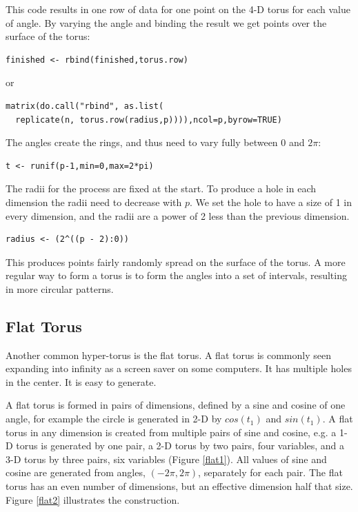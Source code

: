 \documentclass[article]{jss}
\begin{document}
This code results in one row of data for one point on the 4-D torus
for each value of angle.  By varying the angle and binding the result
we get points over the surface of the torus:

\begin{verbatim}
finished <- rbind(finished,torus.row)
\end{verbatim}

or

\begin{verbatim}
matrix(do.call("rbind", as.list(
  replicate(n, torus.row(radius,p)))),ncol=p,byrow=TRUE)
\end{verbatim}

The angles create the rings, and thus need to vary fully between 0 and
$2\pi$:

\begin{verbatim}
t <- runif(p-1,min=0,max=2*pi)
\end{verbatim}

The radii for the process are fixed at the start.  To produce a hole
in each dimension the radii need to decrease with $p$.  We set the
hole to have a size of 1 in every dimension, and the radii are a power
of 2 less than the previous dimension.

\begin{verbatim}
radius <- (2^((p - 2):0))
\end{verbatim}

\noindent This produces points fairly randomly spread on the surface of
the torus.  A more regular way to form a torus is to form the angles
into a set of intervals, resulting in more circular patterns.

\subsection{Flat Torus}

Another common hyper-torus is the flat torus. A flat torus is commonly
seen expanding into infinity as a screen saver on some computers. It
has multiple holes in the center. It is easy to generate.

A flat torus is formed in pairs of dimensions, defined by a sine and
cosine of one angle, for example the circle is generated in 2-D by
$cos(t_1)$ and $sin(t_1)$.  A flat torus in any dimension is created
from multiple pairs of sine and cosine, e.g. a 1-D torus is generated by
one pair, a 2-D torus by two pairs, four variables, and a 3-D torus by
three pairs, six variables (Figure \ref{flat1}).  All values of sine
and cosine are generated from angles, $(-2\pi, 2\pi)$, separately for
each pair.  The flat torus has an even number of dimensions, but an
effective dimension half that size. Figure \ref{flat2} illustrates the
construction.
\end{document}
